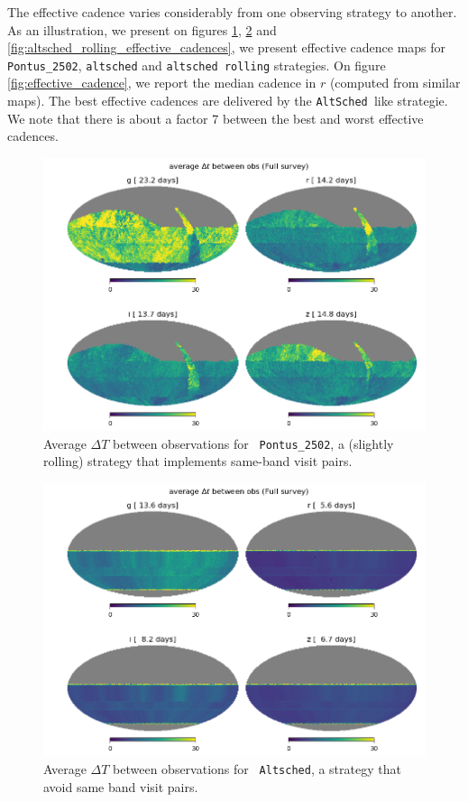\documentclass [11pt,a4paper]{article}
\newcommand{\altsched}{{\tt AltSched\ }}
\begin{document}
The effective cadence varies considerably from one observing strategy
to another.  As an illustration, we present on figures
\ref{fig:pontus_2502_effective_cadences},
\ref{fig:altsched_effective_cadences} and
\ref{fig:altsched_rolling_effective_cadences}, we present effective
cadence maps for {\tt Pontus\_2502}, {\tt altsched} and {\tt altsched
  rolling} strategies.  On figure \ref{fig:effective_cadence}, we
report the median cadence in $r$ (computed from similar maps).  The
best effective cadences are delivered by the \altsched like
strategie. We note that there is about a factor 7 between the best and
worst effective cadences.

\begin{figure}
  \begin{center}
    \includegraphics[width=0.8\linewidth]{Figures/pontus_2502_cadence.png}
    \caption{Average $\Delta T$ between observations for {\tt
        Pontus\_2502}, a (slightly rolling) strategy that implements
      same-band visit pairs. }
    \label{fig:pontus_2502_effective_cadences}
  \end{center}
\end{figure}


\begin{figure}
  \begin{center}
    \includegraphics[width=0.8\linewidth]{Figures/altsched_cadence.png}
    \caption{Average $\Delta T$ between observations for {\tt
        Altsched}, a strategy that avoid same band visit pairs.}
    \label{fig:altsched_effective_cadences}
  \end{center}
\end{figure}
\end{document}
